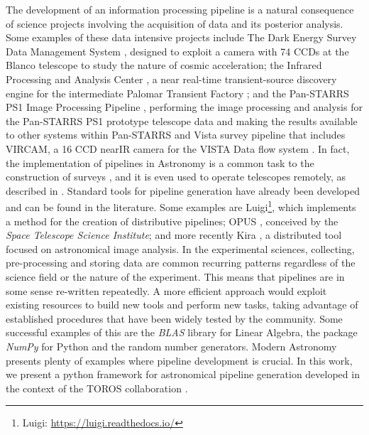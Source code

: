 \documentclass[final,5p,times,twocolumn,authoryear]{elsarticle}
\begin{document}
The development of an information processing pipeline is a natural consequence of
science projects involving the acquisition of data and its posterior analysis.
Some examples of these data intensive projects include The Dark Energy Survey Data Management System \citep{mohr2008dark},
designed to exploit a camera with 74 CCDs at the Blanco telescope
to study the nature of cosmic acceleration;
the Infrared Processing and Analysis Center \citep{masci2016ipac},
a near real-time transient-source discovery engine for the
intermediate Palomar Transient Factory \citep[iPTF][]{kulkarni2013intermediate}; and the Pan-STARRS PS1 Image Processing Pipeline \citep{magnier2006pan},
performing the image processing and analysis for
the Pan-STARRS PS1 prototype telescope data
and making the results available to other systems within Pan-STARRS and Vista survey pipeline that includes VIRCAM, a 16 CCD nearIR camera for the VISTA Data flow system \cite{emerson_vista_2004} .
%
In fact, the implementation of pipelines in Astronomy is a common task
to the construction of surveys \citep[e.g.][]{marx_prototype_2015, hughes_2016, hadjiyska_2012},
and it is even used to operate telescopes remotely, as described in \citet{kubanek_petr_rts2_2010}.
%
Standard tools for pipeline generation have already been developed and can be found in the literature.
Some examples are Luigi\footnote{Luigi: \url{https://luigi.readthedocs.io/}},
which implements a method for the creation of distributive pipelines;
OPUS \citep{rose1995opus}, conceived by the
\textit{Space Telescope Science Institute}; and more recently
Kira \citep{zhang2016kira}, a distributed tool focused on astronomical
image analysis.
%
In the experimental sciences, collecting, pre-processing and storing data
are common recurring patterns regardless of the science field or the nature of the experiment.
This means that pipelines are in some sense re-written repeatedly.
%
A more efficient approach would exploit existing resources to build new tools and perform new tasks,
taking advantage of established procedures that have been widely tested by the community.
%
Some successful examples of this are the \textit{BLAS} library for Linear Algebra, the
package \textit{NumPy} for Python \citep{van2011numpy} and the random number generators.
Modern Astronomy presents plenty of examples where pipeline development is crucial.
%
In this work, we present a python framework for astronomical pipeline generation developed
in the context of the TOROS collaboration
\citep[``Transient Optical Robotic Observatory of the South",][]{toros_diaz_2014}.
%
\end{document}
